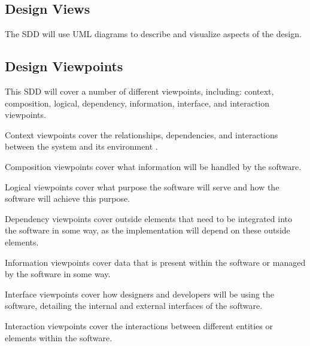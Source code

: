 \documentclass[onecolumn, draftclsnofoot,10pt, compsoc]{IEEEtran}
\begin{document}
\subsection{Design Views}
\noindent The SDD will use UML diagrams to describe and visualize aspects of the design. \\

\subsection{Design Viewpoints}
\noindent This SDD will cover a number of different viewpoints, including:
context, composition, logical, dependency, information, interface, 
and interaction viewpoints. \\

\medskip 

\noindent Context viewpoints cover the relationships, dependencies, and
interactions between the system and its environment \cite{viewpoints}. \\

\medskip 

\noindent Composition viewpoints cover what information will be handled 
by the software. \\

\medskip 

\noindent Logical viewpoints cover what purpose the software will serve 
and how the software will achieve this purpose. \\

\medskip 

\noindent Dependency viewpoints cover outside elements that need to 
be integrated into the software in some way, as the implementation will 
depend on these outside elements. \\

\medskip 

\noindent Information viewpoints cover data that is present within 
the software or managed by the software in some way. \\

\medskip 

\noindent Interface viewpoints cover how designers and developers will 
be using the software, detailing the internal and external interfaces of 
the software. \\

\medskip 

\noindent Interaction viewpoints cover the interactions between different entities or elements within the software. \\
\end{document}
